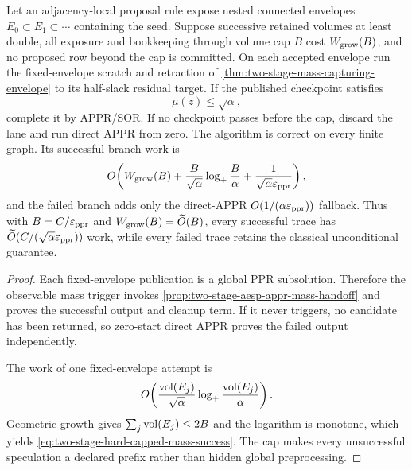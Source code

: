 \begin{theorem}
\label{thm:two-stage-hard-capped-mass-screen}
Let an adjacency-local proposal rule expose nested connected envelopes
$E_0\subset E_1\subset\cdots$ containing the seed.  Suppose successive
retained volumes at least double, all exposure and bookkeeping through volume
cap $B$ cost $W_{\rm grow}(B)$, and no proposed row beyond the cap is
committed.  On each accepted envelope run the fixed-envelope scratch and
retraction of \cref{thm:two-stage-mass-capturing-envelope} to its half-slack
residual target.  If the published checkpoint satisfies
\begin{equation*}
  \mu(z)\leq\sqrt\alpha,
\end{equation*}
complete it by APPR/SOR.  If no checkpoint passes before the cap, discard the
lane and run direct APPR from zero.  The algorithm is correct on every finite
graph.  Its successful-branch work is
\begin{equation}
 O\!\left(
   W_{\rm grow}(B)
   +\frac{B}{\sqrt\alpha}\log_+\frac{B}{\alpha}
   +\frac{1}{\sqrt\alpha\varepsilon_{\mathrm{ppr}}}
 \right),
 \label{eq:two-stage-hard-capped-mass-success}
\end{equation}
and the failed branch adds only the direct-APPR
$O(1/(\alpha\varepsilon_{\mathrm{ppr}}))$ fallback.  Thus with
$B=C/\varepsilon_{\mathrm{ppr}}$ and $W_{\rm grow}(B)=\widetilde O(B)$, every successful trace
has $\widetilde O(C/(\sqrt\alpha\varepsilon_{\mathrm{ppr}}))$ work, while every failed trace
retains the classical unconditional guarantee.
\end{theorem}

\begin{proof}
Each fixed-envelope publication is a global PPR subsolution.  Therefore the
observable mass trigger invokes
\cref{prop:two-stage-aesp-appr-mass-handoff} and proves the successful output
and cleanup term.  If it never triggers, no candidate has been returned, so
zero-start direct APPR proves the failed output independently.

The work of one fixed-envelope attempt is
\begin{equation*}
 O\!\left(
  \frac{\operatorname{vol}(E_j)}{\sqrt\alpha}
  \log_+\frac{\operatorname{vol}(E_j)}{\alpha}
 \right).
\end{equation*}
Geometric growth gives
$\sum_j\operatorname{vol}(E_j)\leq2B$ and the logarithm is monotone, which yields
\cref{eq:two-stage-hard-capped-mass-success}.  The cap makes every unsuccessful
speculation a declared prefix rather than hidden global preprocessing.
\end{proof}

